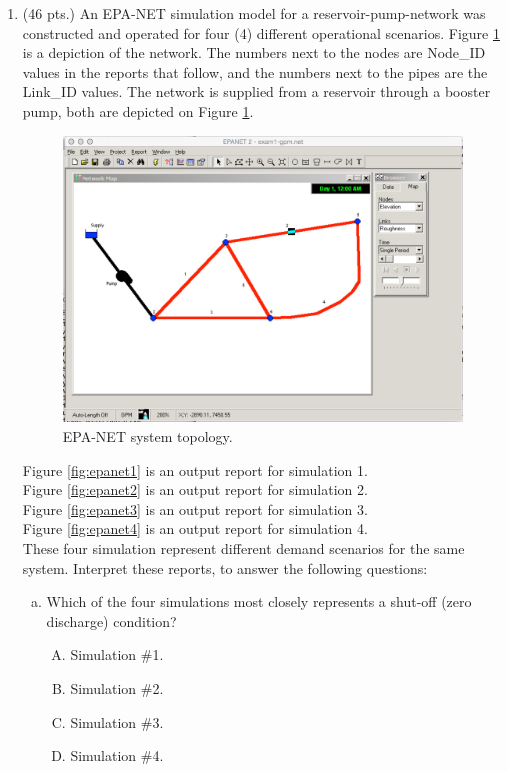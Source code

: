 \documentclass[11pt]{article}
\begin{document}
\begin{enumerate}
\clearpage
\item (46 pts.)
 An EPA-NET simulation model for a reservoir-pump-network was constructed and operated for four (4) different operational scenarios.   Figure \ref{fig:epa-net-map-gpm} is a depiction of the network.   The numbers next to the nodes are Node\_ID values in the reports that follow, and the numbers next to the pipes are the Link\_ID values.  The network is supplied from a reservoir through a booster pump, both are depicted on Figure \ref{fig:epa-net-map-gpm}. 

\begin{figure}[h!] %
\centering
   \includegraphics[width=6in]{epa-net-map-gpm.jpg}
   \caption{EPA-NET system topology.}
   \label{fig:epa-net-map-gpm} 
\end{figure}

Figure \ref{fig:epanet1} is an output report for simulation 1.   \\
Figure \ref{fig:epanet2} is an output report for simulation 2. \\  
Figure \ref{fig:epanet3} is an output report for simulation 3.  \\
Figure \ref{fig:epanet4} is an output report for simulation 4.  \\

These four simulation represent different demand scenarios for the same system.  
Interpret these reports, to answer the following questions:
\newpage
\begin{enumerate}[a)]
\item Which of the four simulations most closely represents a shut-off (zero discharge) condition?
\begin{enumerate}[A)]
\item Simulation \#1.
\item Simulation \#2.
\item Simulation \#3.
\item Simulation \#4.
\end{enumerate}


\end{enumerate}
\end{enumerate}
\end{document}
